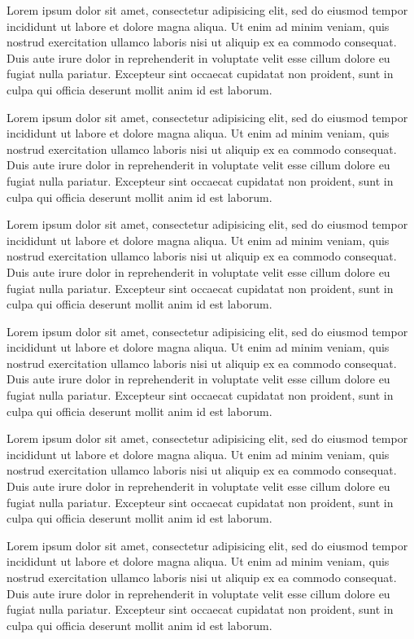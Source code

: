 \documentclass[withindex,glossary]{cam-thesis}
\begin{document}
Lorem ipsum dolor sit amet, consectetur adipisicing elit, sed do eiusmod tempor incididunt ut labore et dolore magna aliqua. Ut enim ad minim veniam, quis nostrud exercitation ullamco laboris nisi ut aliquip ex ea commodo consequat. Duis aute irure dolor in reprehenderit in voluptate velit esse cillum dolore eu fugiat nulla pariatur. Excepteur sint occaecat cupidatat non proident, sunt in culpa qui officia deserunt mollit anim id est laborum.

Lorem ipsum dolor sit amet, consectetur adipisicing elit, sed do eiusmod tempor incididunt ut labore et dolore magna aliqua. Ut enim ad minim veniam, quis nostrud exercitation ullamco laboris nisi ut aliquip ex ea commodo consequat. Duis aute irure dolor in reprehenderit in voluptate velit esse cillum dolore eu fugiat nulla pariatur. Excepteur sint occaecat cupidatat non proident, sunt in culpa qui officia deserunt mollit anim id est laborum.


Lorem ipsum dolor sit amet, consectetur adipisicing elit, sed do eiusmod tempor incididunt ut labore et dolore magna aliqua. Ut enim ad minim veniam, quis nostrud exercitation ullamco laboris nisi ut aliquip ex ea commodo consequat. Duis aute irure dolor in reprehenderit in voluptate velit esse cillum dolore eu fugiat nulla pariatur. Excepteur sint occaecat cupidatat non proident, sunt in culpa qui officia deserunt mollit anim id est laborum.

Lorem ipsum dolor sit amet, consectetur adipisicing elit, sed do eiusmod tempor incididunt ut labore et dolore magna aliqua. Ut enim ad minim veniam, quis nostrud exercitation ullamco laboris nisi ut aliquip ex ea commodo consequat. Duis aute irure dolor in reprehenderit in voluptate velit esse cillum dolore eu fugiat nulla pariatur. Excepteur sint occaecat cupidatat non proident, sunt in culpa qui officia deserunt mollit anim id est laborum.

Lorem ipsum dolor sit amet, consectetur adipisicing elit, sed do eiusmod tempor incididunt ut labore et dolore magna aliqua. Ut enim ad minim veniam, quis nostrud exercitation ullamco laboris nisi ut aliquip ex ea commodo consequat. Duis aute irure dolor in reprehenderit in voluptate velit esse cillum dolore eu fugiat nulla pariatur. Excepteur sint occaecat cupidatat non proident, sunt in culpa qui officia deserunt mollit anim id est laborum.

Lorem ipsum dolor sit amet, consectetur adipisicing elit, sed do eiusmod tempor incididunt ut labore et dolore magna aliqua. Ut enim ad minim veniam, quis nostrud exercitation ullamco laboris nisi ut aliquip ex ea commodo consequat. Duis aute irure dolor in reprehenderit in voluptate velit esse cillum dolore eu fugiat nulla pariatur. Excepteur sint occaecat cupidatat non proident, sunt in culpa qui officia deserunt mollit anim id est laborum.
\end{document}
